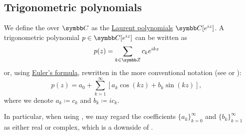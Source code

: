 \subsection{Trigonometric polynomials}\label{subsec:trigonometric_polynomials}

\begin{definition}\label{def:trigonometric_polynomial}
  We define the  over \( \BC \) as the \hyperref[def:laurent_polynomial/polynomial]{Laurent polynomials} \( \BC[e^{iz}] \). A trigonometric polynomial \( p \in \BC[e^{iz}] \) can be written as
  \begin{equation}\label{def:trigonometric_polynomial/exponential}
    p(z) = \sum_{k \in \BZ} c_k e^{ikz}
  \end{equation}
  or, using \hyperref[thm:trigonometric_identities/euler]{Euler's formula}, rewritten in the more conventional notation (see \cite[1]{Боянов2008} or \cite[88]{Rudin1987}):
  \begin{equation}\label{def:trigonometric_polynomial/trigonometric}
    p(z) = a_0 + \sum_{k=1}^\infty [ a_k \cos(kz) + b_k \sin(kz) ],
  \end{equation}
  where we denote \( a_k \coloneqq c_k \) and \( b_k \coloneqq ic_k \).

  In particular, when using , we may regard the coefficients \( \{ a_k \}_{k=0}^\infty \) and \( \{ b_k \}_{k=1}^\infty \) as either real or complex, which is a downside of .
\end{definition}
